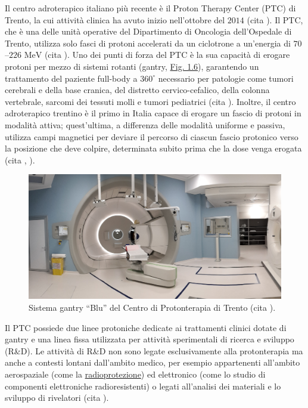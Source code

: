 \documentclass[12pt,a4paper,twoside]{report}
\begin{document}
	Il centro adroterapico italiano più recente è il Proton Therapy Center (PTC) di Trento, la cui attività clinica ha avuto inizio nell'ottobre del $2014$ (cita
	). Il PTC, che è una delle unità operative del Dipartimento di Oncologia dell'Ospedale di Trento, utilizza solo fasci di protoni accelerati da un ciclotrone a un'energia di $70$--$226 \mbox{ MeV}$ (cita
	). Uno dei punti di forza del PTC è la sua capacità di erogare protoni per mezzo di sistemi rotanti (gantry, \hyperref[fig:gantry]{Fig. 1.6}), garantendo un trattamento del paziente full-body a $360^\circ$ necessario per patologie come tumori cerebrali e della base cranica, del distretto cervico-cefalico, della colonna vertebrale, sarcomi dei tessuti molli e tumori pediatrici (cita
	). Inoltre, il centro adroterapico trentino è il primo in Italia capace di erogare un fascio di protoni in modalità attiva; quest'ultima, a differenza delle modalità uniforme e passiva, utilizza campi magnetici per deviare il percorso di ciascun fascio protonico verso la posizione che deve colpire, determinata subito prima che la dose venga erogata (cita	%
	,
	).
	\begin{figure}[H]
		\centering
		\includegraphics[width=0.9\linewidth]{gantry.jpg}
		\caption{Sistema gantry ``Blu'' del Centro di Protonterapia di Trento (cita
			).}
		\label{fig:gantry}
	\end{figure}
	Il PTC possiede due linee protoniche dedicate ai trattamenti clinici dotate di gantry e una linea fissa utilizzata per attività sperimentali di ricerca e sviluppo (R\&D). Le attività di R\&D non sono legate esclusivamente alla protonterapia ma anche a contesti lontani dall'ambito medico, per esempio appartenenti all'ambito aerospaziale (come la \hyperref[??labelradioprotezione??]{radioprotezione}) ed elettronico (come lo studio di componenti elettroniche radioresistenti) o legati all'analisi dei materiali e lo sviluppo di rivelatori (cita
	). 
	
\end{document}
